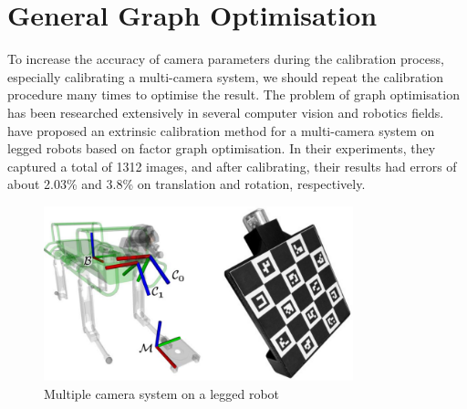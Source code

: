 \clearpage
\section{General Graph Optimisation}
To increase the accuracy of camera parameters during the calibration process, especially calibrating a multi-camera system, we should repeat the calibration procedure many times to optimise the result. The problem of graph optimisation has been researched extensively in several computer vision and robotics fields. \cite{Reinke2019} have proposed an extrinsic calibration method for a multi-camera system on legged robots based on factor graph optimisation. In their experiments, they captured a total of 1312 images, and after calibrating, their results had errors of about 2.03\% and 3.8\% on translation and rotation, respectively.

\begin{figure}[ht]
\centering
\includegraphics[width=0.8\textwidth]{Images/Reinke et al. (2019).png}
\caption{Multiple camera system on a legged robot}
\end{figure}